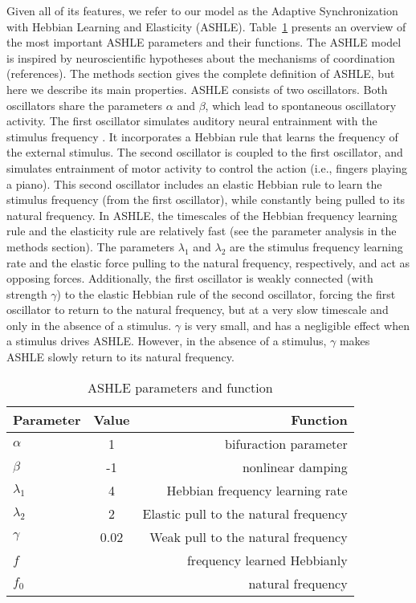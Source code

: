 \documentclass[10pt,letterpaper]{article}
\begin{document}
Given all of its features, we refer to our model as the Adaptive Synchronization with Hebbian Learning and Elasticity (ASHLE). Table~\ref{tab:t3_2} presents an overview of the most important ASHLE parameters and their functions. The ASHLE model is inspired by neuroscientific hypotheses about the mechanisms of coordination (references). The methods section gives the complete definition of ASHLE, but here we describe its main properties. ASHLE consists of two oscillators. Both oscillators share the parameters $\alpha$ and $\beta$, which lead to spontaneous oscillatory activity. The first oscillator simulates auditory neural entrainment with the stimulus frequency \cite{large2015neural, patel2014evolutionary, daly2014changes, grahn2009feeling, grahn2013finding}. It incorporates a Hebbian rule that learns the frequency of the external stimulus. The second oscillator is coupled to the first oscillator, and simulates entrainment of motor activity to control the action (i.e., fingers playing a piano). This second oscillator includes  an  elastic Hebbian rule to learn the stimulus frequency (from the first oscillator), while constantly being pulled to its natural frequency. In ASHLE, the timescales of the Hebbian frequency learning rule and the elasticity rule are relatively fast (see the parameter analysis in the methods section). The parameters $\lambda_1$ and $\lambda_2$ are the stimulus frequency learning rate and the elastic force pulling to the natural frequency, respectively, and act as opposing forces. Additionally, the first oscillator is weakly connected (with strength $\gamma$) to the elastic Hebbian rule of the second oscillator, forcing the first oscillator to return to the natural frequency, but at a very slow timescale and only in the absence of a stimulus. $\gamma$ is very small, and has a negligible effect when a stimulus drives ASHLE. However, in the absence of a stimulus, $\gamma$ makes ASHLE slowly return to its natural frequency.

\begin{table}
    \begin{center}
      \caption{ASHLE parameters and function}
      \label{tab:t3_2}
      \begin{tabular}{l|c|r}
        \textbf{Parameter} & \textbf{Value} & \textbf{Function}\\
        \hline
        $\alpha$ & 1 & bifuraction parameter\\
        \hline
        $\beta$ & -1 & nonlinear damping\\
        \hline
        $\lambda_1$ & 4 & Hebbian frequency learning rate\\
        \hline
        $\lambda_2$ & 2 & Elastic pull to the natural frequency\\
        \hline
        $\gamma$ & 0.02 & Weak pull to the natural frequency\\
        \hline
        $f$ &  & frequency learned Hebbianly\\
        \hline
        $f_0$ &  & natural frequency\\
      \end{tabular}
    \end{center}
\end{table}
\end{document}
